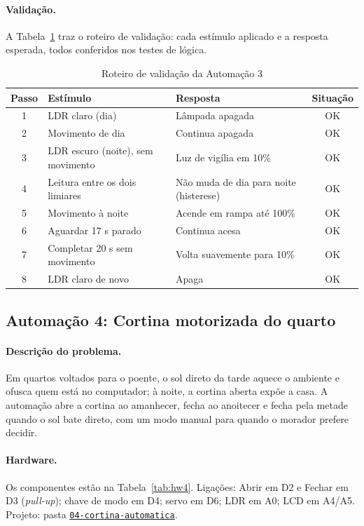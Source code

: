 \documentclass[12pt]{article}
\newcommand{\repositorio}{https://github.com/USUARIO/REPOSITORIO}
\newcommand{\pasta}[1]{\href{\repositorio/tree/main/#1}{\texttt{#1}}}
\begin{document}
\paragraph{Validação.} A Tabela~\ref{tab:val3} traz o roteiro de validação: cada estímulo aplicado e a resposta esperada, todos conferidos nos testes de lógica.

\begin{table}[ht]
\centering
\caption{Roteiro de validação da Automação 3}\label{tab:val3}
\footnotesize
\begin{tabularx}{\textwidth}{cXXc}
\toprule
Passo & Estímulo & Resposta & Situação \\
\midrule
1 & LDR claro (dia) & Lâmpada apagada & OK \\
2 & Movimento de dia & Continua apagada & OK \\
3 & LDR escuro (noite), sem movimento & Luz de vigília em 10\% & OK \\
4 & Leitura entre os dois limiares & Não muda de dia para noite (histerese) & OK \\
5 & Movimento à noite & Acende em rampa até 100\% & OK \\
6 & Aguardar 17 s parado & Continua acesa & OK \\
7 & Completar 20 s sem movimento & Volta suavemente para 10\% & OK \\
8 & LDR claro de novo & Apaga & OK \\
\bottomrule
\end{tabularx}
\end{table}

\subsection{Automação 4: Cortina motorizada do quarto}\label{sub:a4}

\paragraph{Descrição do problema.} Em quartos voltados para o poente, o sol direto da tarde aquece o ambiente e ofusca quem está no computador; à noite, a cortina aberta expõe a casa. A automação abre a cortina ao amanhecer, fecha ao anoitecer e fecha pela metade quando o sol bate direto, com um modo manual para quando o morador prefere decidir.

\paragraph{Hardware.} Os componentes estão na Tabela~\ref{tab:hw4}. Ligações: Abrir em D2 e Fechar em D3 (\emph{pull-up}); chave de modo em D4; servo em D6; LDR em A0; LCD em A4/A5. Projeto: pasta \pasta{04-cortina-automatica}.
\end{document}
